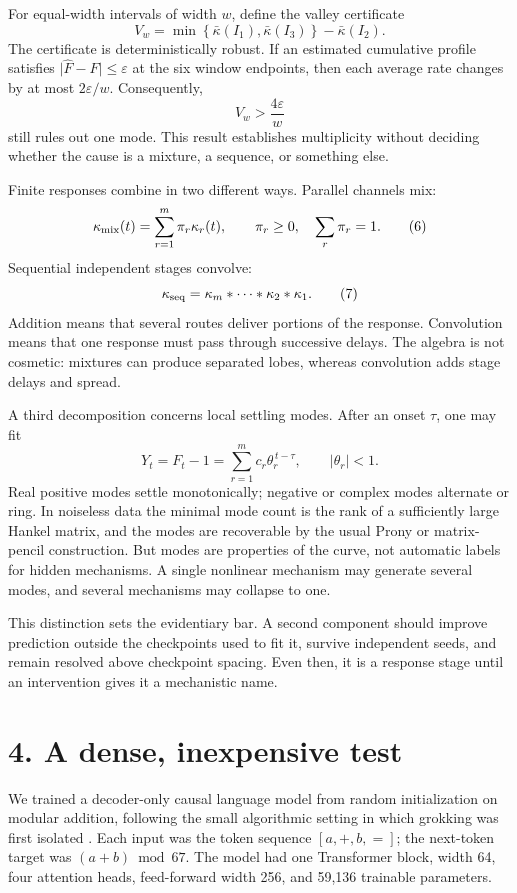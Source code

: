 \documentclass[10pt]{article}
\theoremstyle{compact}
\begin{document}
For equal-width intervals of width \(w\), define the valley certificate
\[
V_w=\min\!\left\{\bar\kappa(I_1),\bar\kappa(I_3)\right\}
-\bar\kappa(I_2).
\]
The certificate is deterministically robust. If an estimated cumulative
profile satisfies \(\lvert\widehat F-F\rvert\le\varepsilon\) at the six
window endpoints, then each average rate changes by at most
\(2\varepsilon/w\). Consequently,
\[
\widehat V_w>\frac{4\varepsilon}{w}
\]
still rules out one mode. This result establishes multiplicity without
deciding whether the cause is a mixture, a sequence, or something else.

Finite responses combine in two different ways. Parallel channels mix:
\[
\kappa_{\rm mix}(t)=\sum_{r=1}^{m}\pi_r\kappa_r(t),
\qquad \pi_r\ge0,\quad\sum_r\pi_r=1.
\tag{6}
\]
Sequential independent stages convolve:
\[
\kappa_{\rm seq}=\kappa_m*\cdots*\kappa_2*\kappa_1.
\tag{7}
\]
Addition means that several routes deliver portions of the response.
Convolution means that one response must pass through successive delays. The
algebra is not cosmetic: mixtures can produce separated lobes, whereas
convolution adds stage delays and spread.

A third decomposition concerns local settling modes. After an onset \(\tau\),
one may fit
\[
Y_t=F_t-1=\sum_{r=1}^{m}c_r\theta_r^{\,t-\tau},
\qquad |\theta_r|<1.
\tag{8}
\]
Real positive modes settle monotonically; negative or complex modes alternate
or ring. In noiseless data the minimal mode count is the rank of a sufficiently
large Hankel matrix, and the modes are recoverable by the usual Prony or
matrix-pencil construction. But modes are properties of the curve, not
automatic labels for hidden mechanisms. A single nonlinear mechanism may
generate several modes, and several mechanisms may collapse to one.

This distinction sets the evidentiary bar. A second component should improve
prediction outside the checkpoints used to fit it, survive independent seeds,
and remain resolved above checkpoint spacing. Even then, it is a response
stage until an intervention gives it a mechanistic name.

\section*{4. A dense, inexpensive test}

We trained a decoder-only causal language model from random initialization on
modular addition, following the small algorithmic setting in which grokking
was first isolated \cite{power2022}. Each input was the token sequence
\([a,+,b,=]\); the next-token target was \((a+b)\bmod67\). The model had one
Transformer block, width 64, four attention heads, feed-forward width 256, and
59,136 trainable parameters.
\end{document}
